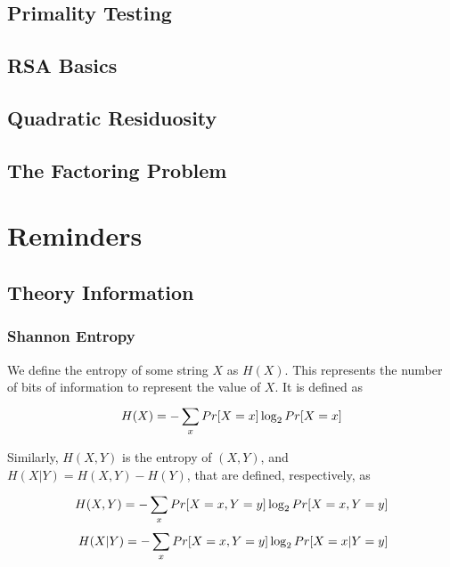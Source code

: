 \documentclass[11pt,a4paper]{article}
\begin{document}
\subsection{Primality Testing} %
\label{sub:Primality Testing}


\subsection{RSA Basics} %
\label{sub:RSA Basics}


\subsection{Quadratic Residuosity} %
\label{sub:Quadratic Residuosity}


\subsection{The Factoring Problem} %
\label{sub:The Factoring Problem}

\appendix
\section{Reminders}
\subsection{Theory Information} %
\label{sub:Theory Information}
\subsubsection{Shannon Entropy} %
\label{ssub:Shannon Entropy}
\begin{definition}[Entropy]
    We define the entropy of some string $X$ as $H(X)$. This represents the number of bits of information to represent the value of $X$. It is defined as
    \begin{equation}
        H(X) = -\sum\limits_{x}^{}Pr[X=x]\log_2 Pr[X=x]
    \end{equation}
\end{definition}
 Similarly, $H(X,Y)$ is the entropy of $(X,Y)$, and $H(X|Y) = H(X,Y) - H(Y)$, that are defined, respectively, as
 \begin{align}
     H(X,Y) = -\sum\limits_{x}^{}Pr[X=x, Y=y]\log_2 Pr[X=x,Y=y]\\
     H(X|Y) = -\sum\limits_{x}^{}Pr[X=x,Y=y]\log_2 Pr[X=x|Y=y]
 \end{align}
\end{document}
